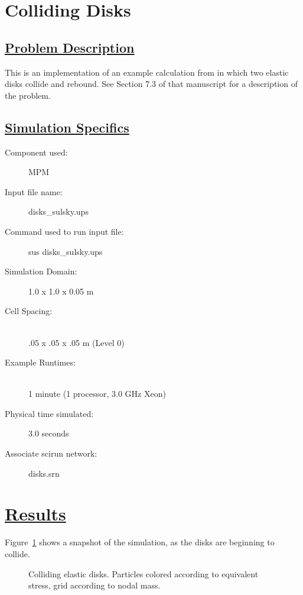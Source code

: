 \documentclass[fleqn]{article}
\begin{document}
\section*{\center Colliding Disks}
\subsection*{\underline{Problem Description}}
This is an implementation of an example calculation from \cite{sulskycmame} in
which two elastic disks collide and rebound.  See Section 7.3 of that
manuscript for a description of the problem.
 
\subsection*{\underline{Simulation Specifics}}
\begin{description} 
\item [Component used:] \hfill MPM
\item [Input file name:] \hfill disks\_sulsky.ups
\item [Command used to run input file:]\hfill sus disks\_sulsky.ups
\item [Simulation Domain:]\hfill    1.0 x 1.0 x 0.05 m

\item [Cell Spacing:]\hfill \\ 
.05 x .05 x .05 m (Level 0)

\item [Example Runtimes:] \hfill \\
 1 minute   (1 processor, 3.0 GHz Xeon)\\

\item [Physical time simulated:] \hfill 3.0 seconds

\item [Associate scirun network:] \hfill disks.srn

\end{description}

\section*{\underline{Results}}

Figure~\ref{figdisks} shows a snapshot of the simulation, as the disks
are beginning to collide.

\begin{figure}[]
  \center
  \caption{Colliding elastic disks.  Particles colored according to
equivalent stress, grid according to nodal mass.}
  \label{figdisks}
\end{figure}
\end{document}
